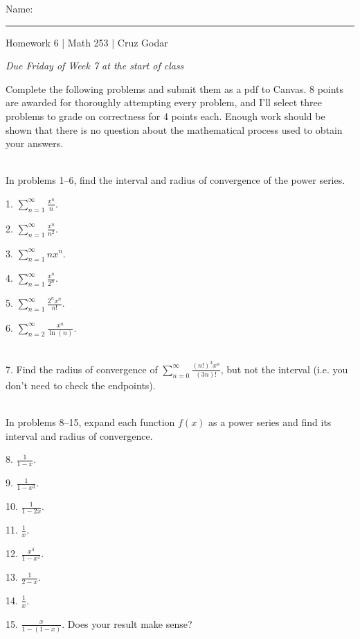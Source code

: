 \documentclass{article}
\begin{document}
\Large Name: \rule{2in}{0.15mm} \hfill Homework 6 | Math 253 | Cruz Godar \vspace{4pt} \normalsize

\textit{Due Friday of Week 7 at the start of class}

Complete the following problems and submit them as a pdf to Canvas. 8 points are awarded for thoroughly attempting every problem, and I'll select three problems to grade on correctness for 4 points each. Enough work should be shown that there is no question about the mathematical process used to obtain your answers.

~\\

In problems 1--6, find the interval and radius of convergence of the power series.

1. $\displaystyle \sum_{n = 1}^\infty \frac{x^n}{n}$.

2. $\displaystyle \sum_{n = 1}^\infty \frac{x^n}{n^2}$.

3. $\displaystyle \sum_{n = 1}^\infty nx^n$.

4. $\displaystyle \sum_{n = 1}^\infty \frac{x^n}{2^n}$.

5. $\displaystyle \sum_{n = 1}^\infty \frac{2^n x^n}{n!}$.

6. $\displaystyle \sum_{n = 2}^\infty \frac{x^n}{\ln(n)}$.

~\\

7. Find the radius of convergence of $\displaystyle \sum_{n = 0}^\infty \frac{(n!)^3 x^n}{(3n)!}$, but not the interval (i.e. you don't need to check the endpoints).

~\\

In problems 8--15, expand each function $f(x)$ as a power series and find its interval and radius of convergence.

8. $\displaystyle \frac{1}{1 - x}$.

9. $\displaystyle \frac{1}{1 - x^3}$.

10. $\displaystyle \frac{1}{1 - 2x}$.

11. $\displaystyle \frac{1}{x}$.

12. $\displaystyle \frac{x^4}{1 - x^2}$.

13. $\displaystyle \frac{1}{2 - x}$.

14. $\displaystyle \frac{1}{x}$.

15. $\displaystyle \frac{x}{1 - (1 - x)}$. Does your result make sense?
\end{document}
